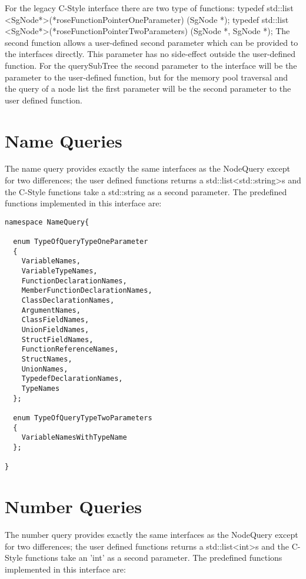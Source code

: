 For the legacy C-Style interface there are two type of functions:
  typedef std::list <SgNode*>(*roseFunctionPointerOneParameter) (SgNode *);
  typedef std::list <SgNode*>(*roseFunctionPointerTwoParameters) (SgNode *, SgNode *);
The second function allows a user-defined second parameter which  can be
provided to the interfaces directly. This parameter has no side-effect outside
the user-defined function. For the querySubTree the second parameter to the interface 
will be the parameter to the user-defined function, but for the memory pool
traversal and the query of a node list the first parameter will be the second
parameter to the user defined function.



\section{Name Queries}

The name query provides exactly the same interfaces as the NodeQuery except
for two differences; the user defined functions returns a
std::list<std::string>s and the C-Style functions take a std::string as a
second parameter. The predefined functions implemented in this interface are:

{\mySmallestFontSize
\begin{verbatim}
namespace NameQuery{

  enum TypeOfQueryTypeOneParameter
  {
    VariableNames,
    VariableTypeNames,
    FunctionDeclarationNames,
    MemberFunctionDeclarationNames,
    ClassDeclarationNames,
    ArgumentNames,
    ClassFieldNames,
    UnionFieldNames,
    StructFieldNames,
    FunctionReferenceNames,
    StructNames,
    UnionNames,
    TypedefDeclarationNames,
    TypeNames
  };

  enum TypeOfQueryTypeTwoParameters
  {
    VariableNamesWithTypeName
  };

}
\end{verbatim}
}

\section{Number Queries}

The number query provides exactly the same interfaces as the NodeQuery except
for two differences; the user defined functions returns a
std::list<int>s and the C-Style functions take an 'int' as a
second parameter. The predefined functions implemented in this interface are:

